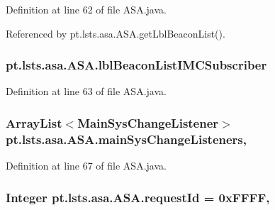 Definition at line 62 of file A\+S\+A.\+java.



Referenced by pt.\+lsts.\+asa.\+A\+S\+A.\+get\+Lbl\+Beacon\+List().

\hypertarget{classpt_1_1lsts_1_1asa_1_1ASA_aa2b1a5f76f5a080ba4e4f3d4f2e83a3c}{}
\subsubsection[{lbl\+Beacon\+List\+I\+M\+C\+Subscriber}]{ pt.\+lsts.\+asa.\+A\+S\+A.\+lbl\+Beacon\+List\+I\+M\+C\+Subscriber\hspace{0.3cm}{\ttfamily [static]}}\label{classpt_1_1lsts_1_1asa_1_1ASA_aa2b1a5f76f5a080ba4e4f3d4f2e83a3c}


Definition at line 63 of file A\+S\+A.\+java.

\hypertarget{classpt_1_1lsts_1_1asa_1_1ASA_afb8ea93835a90aa2b9ad4fa39321f784}{}
\subsubsection[{main\+Sys\+Change\+Listeners}]{\setlength{\rightskip}{0pt plus 5cm}Array\+List$<${\bf Main\+Sys\+Change\+Listener}$>$ pt.\+lsts.\+asa.\+A\+S\+A.\+main\+Sys\+Change\+Listeners\hspace{0.3cm}{\ttfamily [static]}, {\ttfamily [private]}}\label{classpt_1_1lsts_1_1asa_1_1ASA_afb8ea93835a90aa2b9ad4fa39321f784}


Definition at line 67 of file A\+S\+A.\+java.

\hypertarget{classpt_1_1lsts_1_1asa_1_1ASA_a377d6b4e9ec10904dd211d16eb724cc8}{}
\subsubsection[{request\+Id}]{\setlength{\rightskip}{0pt plus 5cm}Integer pt.\+lsts.\+asa.\+A\+S\+A.\+request\+Id = 0x\+F\+F\+F\+F\hspace{0.3cm}{\ttfamily [static]}, {\ttfamily [private]}}\label{classpt_1_1lsts_1_1asa_1_1ASA_a377d6b4e9ec10904dd211d16eb724cc8}



